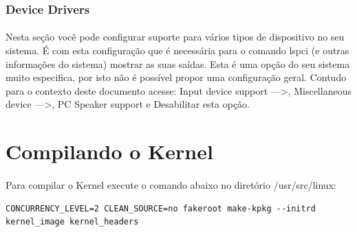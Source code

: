 \documentclass[a4paper,10pt]{article}
\begin{document}
  \subsubsection{Device Drivers}
  \paragraph{}
  Nesta seção você pode configurar suporte para vários tipos de dispositivo no seu sistema. É com esta configuração que é necessária para 
  o comando lspci (e outras informações do sistema) mostrar as suas saídas. Esta é uma opção do seu sistema muito especifica, por isto não
  é possível propor uma configuração geral. Contudo para o contexto deste documento acesse: Input device support --->, Miscellaneous device --->,
  PC Speaker support e Desabilitar esta opção.

  \section{Compilando o Kernel}
  \paragraph{}
  Para compilar o Kernel execute o comando abaixo no diretório /usr/src/linux: 
	{\small  
  \begin{verbatim}CONCURRENCY_LEVEL=2 CLEAN_SOURCE=no fakeroot make-kpkg --initrd kernel_image kernel_headers
  \end{verbatim}
	} 

\end{document}
